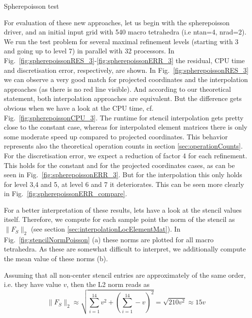 \documentclass[a4paper,11pt,reqno]{amsart}
\numberwithin{figure}{section}
\numberwithin{table}{section}
\begin{document}
\begin{section}{Spherepoisson test}



For evaluation of these new approaches, let us begin with the spherepoisson driver, 
and an initial input grid with 
540 macro tetrahedra (i.e ntan=4, nrad=2). We run the test problem for several
maximal refinement levels (starting with 3 and going up to level 7) in parallel
with 32 processors. In Fig.~\ref{fig:spherepoissonRES_3}-\ref{fig:spherepoissonERR_3}
the residual, CPU time and discretisation error, respectively, are shown.
In Fig.~\ref{fig:spherepoissonRES_3} we can observe a very good match for
projected coordinates and the interpolation
approaches (as there is no red line visible).
And according to our theoretical statement, both interpolation approaches are
equivalent. But the difference gets obvious when we have a look at the CPU time,
cf. Fig.~\ref{fig:spherepoissonCPU_3}. The runtime for stencil interpolation
gets pretty close to the constant case, whereas for interpolated element matrices
there is only some moderate speed up compared to projected coordinates.
This behavior represents also the theoretical operation counts in section 
\ref{sec:operationCounts}.
For the discretisation error, we expect a reduction
of factor 4 for each refinement. This holds for the constant and for the projected
coordinates cases, as can be seen in Fig.~\ref{fig:spherepoissonERR_3}. But for
the interpolation this only holds for level 3,4 and 5, at level 6 and 7 it deteriorates.
This can be seen more clearly in Fig.~\ref{fig:spherepoissonERR_compare}.

For a better interpretation of these results, lets have a look at the stencil values itself.
Therefore, we compute for each sample point the norm of the stencil as $\|F_S\|_2$ 
(see section \ref{sec:interpolationLocElementMat}).
In Fig.~\ref{fig:stencilNormPoisson} (a) these norms are plotted for all macro tetrahedra.
As these are somewhat difficult to interpret, we additionally compute the mean value
of these norms (b). 

Assuming that all non-center stencil entries are approximately of the same order,
i.e. they have value $v$, then the L2 norm reads as
\begin{equation}
\|F_S\|_2 \approx \sqrt{\sum_{i=1}^{14}v^2 + \left(\sum_{i=1}^{14}-v\right)^2}
= \sqrt{210 v^2} \approx 15v
\end{equation}




\end{section}
\end{document}
